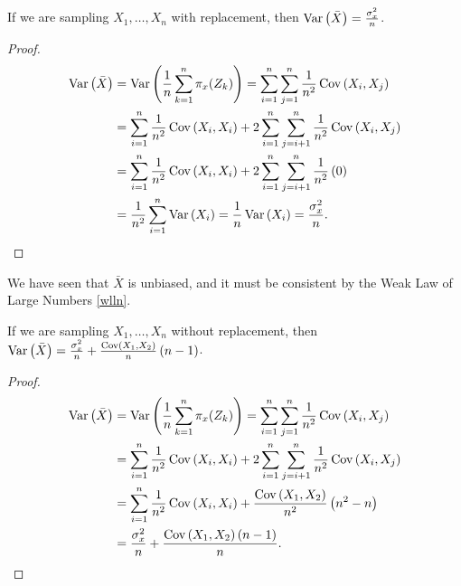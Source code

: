 \begin{prop}
    If we are sampling $X_1, \ldots, X_n$ with replacement, then $\operatorname{Var}\left(\bar{X}\right) = \frac{\sigma_x^2}{n}$.
\end{prop}

\begin{proof}
    \begin{align*}
        \operatorname{Var}\left(\bar{X}\right) &= \operatorname{Var}\left(\frac{1}{n}\sum_{k=1}^{n}\pi_{x}(Z_k)\right) = \sum_{i=1}^{n}\sum_{j=1}^{n}\frac{1}{n^2}\operatorname{Cov}\left(X_i, X_j\right) \\
        &= \sum_{i=1}^{n}\frac{1}{n^2}\operatorname{Cov}\left(X_i, X_i\right) + 2\sum_{i=1}^{n}\sum_{j=i+1}^{n}\frac{1}{n^2}\operatorname{Cov}\left(X_i, X_j\right) \\
        &= \sum_{i=1}^{n}\frac{1}{n^2}\operatorname{Cov}\left(X_i, X_i\right) + 2\sum_{i=1}^{n}\sum_{j=i+1}^{n}\frac{1}{n^2}\left(0\right) \\
        &= \frac{1}{n^2}\sum_{i=1}^{n}\operatorname{Var}\left(X_i\right) = \frac{1}{n}\operatorname{Var}\left(X_i\right) = \frac{\sigma_x^2}{n}.
    \end{align*}
\end{proof}

\begin{rmk}
    We have seen that $\bar{X}$ is unbiased, and it must be consistent by the Weak Law of Large Numbers \ref{wlln}.
\end{rmk}

\begin{prop}
    If we are sampling $X_1, \ldots, X_n$ without replacement, then $\operatorname{Var}\left(\bar{X}\right) = \frac{\sigma_x^2}{n} + \frac{\operatorname{Cov}\left(X_1, X_2\right)}{n}\left(n-1\right)$.
\end{prop}

\begin{proof}
    \begin{align*}
        \operatorname{Var}\left(\bar{X}\right) &= \operatorname{Var}\left(\frac{1}{n}\sum_{k=1}^{n}\pi_{x}(Z_k)\right) = \sum_{i=1}^{n}\sum_{j=1}^{n}\frac{1}{n^2}\operatorname{Cov}\left(X_i, X_j\right) \\
        &= \sum_{i=1}^{n}\frac{1}{n^2}\operatorname{Cov}\left(X_i, X_i\right) + 2\sum_{i=1}^{n}\sum_{j=i+1}^{n}\frac{1}{n^2}\operatorname{Cov}\left(X_i, X_j\right) \\
        &= \sum_{i=1}^{n}\frac{1}{n^2}\operatorname{Cov}\left(X_i, X_i\right) + \frac{\operatorname{Cov}\left(X_1, X_2\right)}{n^2}\left(n^2 - n\right) \\
        &= \frac{\sigma_x^2}{n} + \frac{\operatorname{Cov}\left(X_1, X_2\right)\left(n-1\right)}{n}.
    \end{align*}
\end{proof}

